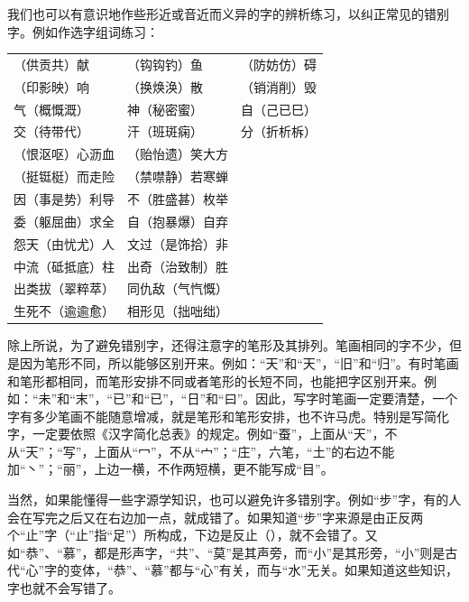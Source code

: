 我们也可以有意识地作些形近或音近而义异的字的辨析练习，以纠正常见的错别字。例如作选字组词练习：
\vspace{1em}

\begin{tabular}{lll}
	（供贡共）献 & （钩钩钓）鱼 & （防妨仿）碍\\
	（印影映）响 & （换焕涣）散 & （销消削）毁\\
	气（概慨溉） & 神（秘密蜜） & 自（己已巳）\\
	交（待带代） & 汗（班斑痫） & 分（折析柝）\\
	（恨沤呕）心沥血 & （贻怡遗）笑大方 &\\
	（挺铤梃）而走险 & （禁噤静）若寒蝉 &\\
	因（事是势）利导 & 不（胜盛甚）枚举 &\\
	委（躯屈曲）求全 & 自（抱暴爆）自弃 &\\
	怨天（由忧尤）人 & 文过（是饰拾）非 &\\
	中流（砥抵底）柱 & 出奇（治致制）胜 &\\
	出类拔（翠粹萃） & 同仇敌（气忾慨） &\\
	生死不（逾逾愈） & 相形见（拙咄绌） &\\
\end{tabular}
\vspace{1em}

除上所说，为了避免错别字，还得注意字的笔形及其排列。笔画相同的字不少，但是因为笔形不同，所以能够区别开来。例如：“天”和“天”，“旧”和“归”。有时笔画和笔形都相同，而笔形安排不同或者笔形的长短不同，也能把字区别开来。例如：“未”和“末”，“已”和“已”，“日”和“曰”。因此，写字时笔画一定要清楚，一个字有多少笔画不能随意增减，就是笔形和笔形安排，也不许马虎。特别是写简化字，一定要依照《汉字简化总表》的规定。例如“蚕”，上面从“天”，不从“天”；“写”，上面从“冖”，不从“宀”；“庄”，六笔，“土”的右边不能加“丶”；“丽”，上边一横，不作两短横，更不能写成“目”。

当然，如果能懂得一些字源学知识，也可以避免许多错别字。例如“步”字，有的人会在写完之后又在右边加一点，就成错了。如果知道“步”字来源是由正反两个“止”字（“止”指“足”）所构成，下边是反止（），就不会错了。又如“恭”、“慕”，都是形声字，“共”、“莫”是其声旁，而“小”是其形旁，“小”则是古代“心”字的变体，“恭”、“慕”都与“心”有关，而与“水”无关。如果知道这些知识，字也就不会写错了。
\newpage